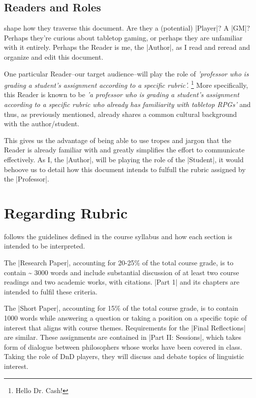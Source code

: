 \documentclass[10pt,twoside,twocolumn,openany,nomultitoc]{book}
\begin{document}
 \subsection{Readers and Roles}   
     shape how they traverse this document.  Are they a (potential) |Player|? A |GM|? Perhaps they're curious about tabletop gaming, or perhaps they are unfamiliar with it entirely. Perhaps the Reader is me, the |Author|, as I read and reread and organize and edit this document.

        One particular Reader--our target audience--will play the role of \textit{'professor who is grading a student's assignment according to a specific rubric'.} 
       \footnote{Hello Dr. Cash!} 
        More specifically, this Reader is known to be \textit{'a professor who is grading a student's assignment according to a specific rubric who already has familiarity with tabletop RPGs'} and thus, as previously mentioned, already shares a common cultural background with the author/student.

    This gives us the advantage of being able to use tropes and jargon that the Reader is already familiar with and greatly simplifies the effort to communicate effectively. As I, the |Author|, will be playing the role of the |Student|, it would behoove us to detail how this document intends to fulfull the rubric assigned by the |Professor|. 
 
 \section{Regarding Rubric}\vspace{6pt}
     follows the guidelines defined in the course syllabus and how each section is intended to be interpreted. 
    
    The |Research Paper|, accounting for 20-25\% of the total course grade, is to contain \~{} 3000 words and include substantial discussion of at least two course readings and two academic works, with citations. |Part 1| and its chapters are intended to fulfil these criteria. %
    
    The |Short Paper|, accounting for 15\% of the total course grade, is to contain 1000 words while answering a question or taking a position on a specific topic of interest that aligns with course themes. Requirements for the |Final Reflections| are similar. These assignments are contained in |Part II: Sessions|, which takes form of dialogue between philosophers whose works have been covered in class. Taking the role of DnD players, they will discuss and debate topics of linguistic interest. 
    
\end{document}
